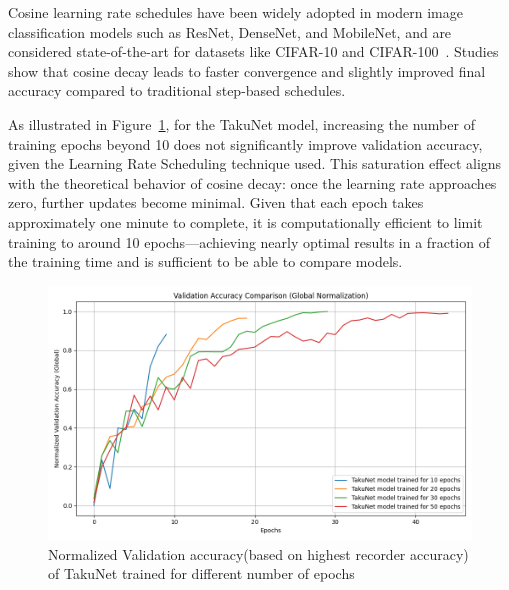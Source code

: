 Cosine learning rate schedules have been widely adopted in modern image classification models such as ResNet, DenseNet, and MobileNet, and are considered state-of-the-art for datasets like CIFAR-10 and CIFAR-100~\cite{lewkowycz2021decay}. Studies show that cosine decay leads to faster convergence and slightly improved final accuracy compared to traditional step-based schedules.

As illustrated in Figure~\ref{fig:val_accuracy_diff_epochs}, for the TakuNet model, increasing the number of training epochs beyond 10 does not significantly improve validation accuracy, given the Learning Rate Scheduling technique used. This saturation effect aligns with the theoretical behavior of cosine decay: once the learning rate approaches zero, further updates become minimal. Given that each epoch takes approximately one minute to complete, it is computationally efficient to limit training to around 10 epochs—achieving nearly optimal results in a fraction of the training time and is sufficient to be able to compare models.

\begin{figure}[ht]
    \centering
    \includegraphics[width=0.85\linewidth]{Pictures/val_accuracy_comparison_global.png}
    \caption{Normalized Validation accuracy(based on highest recorder accuracy) of TakuNet trained for different number of epochs }
    \label{fig:val_accuracy_diff_epochs}
\end{figure}